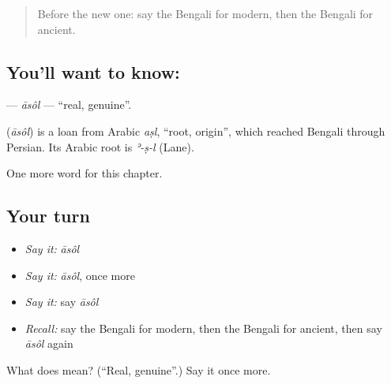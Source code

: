 \begin{quote}
Before the new one: say the Bengali for modern, then the Bengali for ancient.
\end{quote}

\subsection*{You'll want to know: }
\textbf{} — \emph{āsôl} — \textquotedblleft{}real, genuine\textquotedblright{}.

\begin{cousinweb}
\textbf{} (\emph{āsôl}) is a loan from Arabic \emph{aṣl}, \textquotedblleft{}root, origin\textquotedblright{}, which reached Bengali through Persian. Its Arabic root is \emph{ʾ-ṣ-l} (Lane).
\end{cousinweb}

\begin{grammarlens}[title={What you've built}]
One more word for this chapter.
\end{grammarlens}

\subsection*{Your turn}
\begin{itemize}
\raggedright
  \item \emph{Say it:} \emph{āsôl}
  \item \emph{Say it:} \emph{āsôl}, once more
  \item \emph{Say it:} say \emph{āsôl}
  \item \emph{Recall:} say the Bengali for modern, then the Bengali for ancient, then say \emph{āsôl} again
\end{itemize}

\begin{tcolorbox}[breakable,colback=teal!4,colframe=teal!35!black,title={Before you move on}]
What does  mean? (\textquotedblleft{}Real, genuine\textquotedblright{}.) Say it once more.
\end{tcolorbox}
